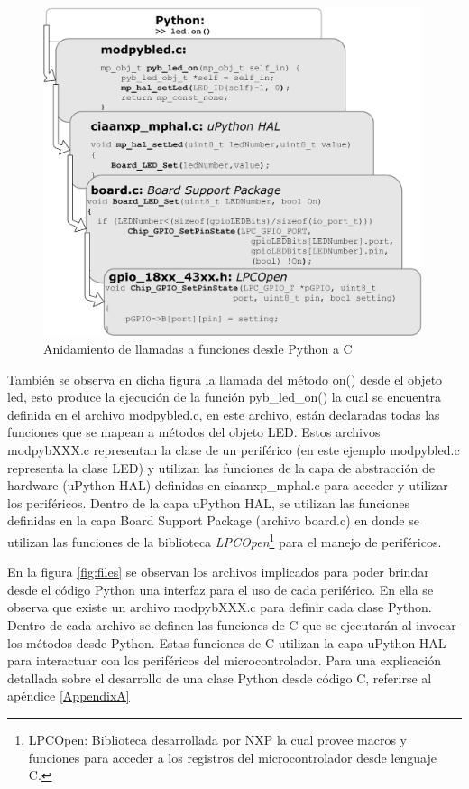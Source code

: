 \begin{figure}[ht]
  \centering
    \includegraphics[width=0.99\textwidth]{Figures/fig_calls}
  \caption{Anidamiento de llamadas a funciones desde Python a C}
  \label{fig:calls}
\end{figure}

También se observa en dicha figura la llamada del método on() desde el objeto led, esto produce la ejecución de la función pyb\_led\_on() la cual se encuentra definida en el archivo modpybled.c, en este archivo, están declaradas todas las funciones que se mapean a métodos del objeto LED.
Estos archivos modpybXXX.c representan la clase de un periférico (en este ejemplo modpybled.c representa la clase LED) y utilizan las funciones de la capa de abstracción de hardware (uPython HAL) definidas en ciaanxp\_mphal.c para acceder y utilizar los periféricos.
Dentro de la capa uPython HAL, se utilizan las funciones definidas en la capa Board Support Package (archivo board.c) en donde se utilizan las funciones de la biblioteca \textit{LPCOpen}\footnote{LPCOpen: Biblioteca desarrollada por NXP la cual provee macros y funciones para acceder a los registros del microcontrolador desde lenguaje C.} para el manejo de periféricos.

En la figura \ref{fig:files} se observan los archivos implicados para poder brindar desde el código Python una interfaz para el uso de cada periférico. En ella se observa que existe un archivo modpybXXX.c para definir cada clase Python. Dentro de cada archivo se definen las funciones de C que se ejecutarán al invocar los métodos desde Python. Estas funciones de C utilizan la capa uPython HAL para interactuar con los periféricos del microcontrolador.
Para una explicación detallada sobre el desarrollo de una clase Python desde código C, referirse al apéndice \ref{AppendixA}

